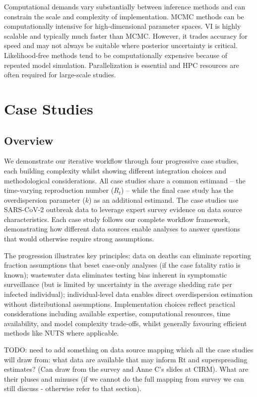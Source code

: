 \documentclass{article}
\begin{document}
Computational demands vary substantially between inference methods and can constrain the scale and complexity of implementation. MCMC methods can be computationally intensive for high-dimensional parameter spaces. VI is highly scalable and typically much faster than MCMC. However, it trades accuracy for speed and may not always be suitable where posterior uncertainty is critical. Likelihood-free methods tend to be computationally expensive because of repeated model simulation. Parallelization is essential and HPC resources are often required for large-scale studies. 


\section{Case Studies}

\subsection{Overview}

We demonstrate our iterative workflow through four progressive case studies, each building complexity whilst showing different integration choices and methodological considerations.
All case studies share a common estimand -- the time-varying reproduction number ($R_t$) -- while the final case study has the overdispersion parameter ($k$) as an additional estimand. The case studies use SARS-CoV-2 outbreak data to leverage expert survey evidence on data source characteristics.
Each case study follows our complete workflow framework, demonstrating how different data sources enable analyses to answer questions that would otherwise require strong assumptions.

The progression illustrates key principles: data on deaths can eliminate reporting fraction assumptions that beset case-only analyses (if the case fatality ratio is known); wastewater data eliminates testing bias inherent in symptomatic surveillance (but is limited by uncertainty in the average shedding rate per infected individual); individual-level data enables direct overdispersion estimation without distributional assumptions.
Implementation choices reflect practical considerations including available expertise, computational resources, time availability, and model complexity trade-offs, whilst generally favouring efficient methods like NUTS where applicable.

TODO: need to add something on data source mapping which all the case studies will draw from: what data are available that may inform Rt and superspreading estimates? (Can draw from the survey and Anne C's slides at CIRM). What are their pluses and minuses (if we cannot do the full mapping from survey we can still discuss - otherwise refer to that section).
\end{document}
